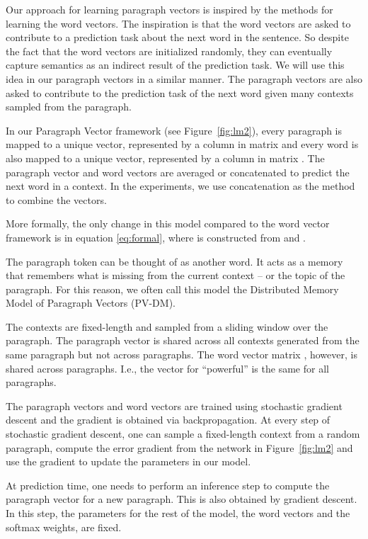 \documentclass{article}
\begin{document}
Our approach for learning paragraph vectors is inspired by the methods
for learning the word vectors. The inspiration is that the word
vectors are asked to contribute to a prediction task about the next
word in the sentence. So despite the fact that the word vectors are
initialized randomly, they can eventually capture semantics as an
indirect result of the prediction task. We will use this idea in our
paragraph vectors in a similar manner. The paragraph vectors are also
asked to contribute to the prediction task of the next word given many
contexts sampled from the paragraph.

In our Paragraph Vector framework (see Figure~\ref{fig:lm2}), every
paragraph is mapped to a unique vector, represented by a column in
matrix  and every word is also mapped to a unique vector,
represented by a column in matrix . The paragraph vector and word
vectors are averaged or concatenated to predict the next word in a
context. In the experiments, we use concatenation as the method to
combine the vectors. 

More formally, the only change in this model compared to the word
vector framework is in equation \ref{eq:formal}, where  is
constructed from  and .

The paragraph token can be thought of as another word. It acts as a
memory that remembers what is missing from the current context -- or
the topic of the paragraph. For this reason, we often call this model
the Distributed Memory Model of Paragraph Vectors (PV-DM). 

The contexts are fixed-length and sampled from a sliding window over
the paragraph. The paragraph vector is shared across all contexts
generated from the same paragraph but not across paragraphs. The word
vector matrix , however, is shared across paragraphs. I.e., the
vector for ``powerful'' is the same for all paragraphs.

The paragraph vectors and word vectors are trained using stochastic
gradient descent and the gradient is obtained via backpropagation. At
every step of stochastic gradient descent, one can sample a
fixed-length context from a random paragraph, compute the error
gradient from the network in Figure~\ref{fig:lm2} and use the gradient
to update the parameters in our model.


At prediction time, one needs to perform an inference step to compute
the paragraph vector for a new paragraph. This is also obtained by
gradient descent. In this step, the parameters for the rest of the
model, the word vectors  and the softmax weights, are fixed.
\end{document}
